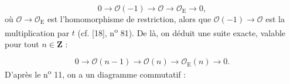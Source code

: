 \begin{equation*}
0 \rightarrow \mathcal{O}(-1) \rightarrow \mathcal{O} \rightarrow \mathcal{O}_{\mathrm{E}} \rightarrow 0,
\end{equation*}
où $\mathcal{O} \rightarrow \mathcal{O}_{\mathrm{E}}$ est l'homomorphisme de restriction, alors que $\mathcal{O}(-1) \rightarrow \mathcal{O}$ est la multiplication par $t$ (cf. [18], n\textsuperscript{o} 81). De là, on déduit une suite exacte, valable pour tout $n \in \mathbf{Z}$ :

\begin{equation*}
0 \rightarrow \mathcal{O}(n-1) \rightarrow \mathcal{O}(n) \rightarrow \mathcal{O}_{\mathrm{E}}(n) \rightarrow 0.
\end{equation*}
D'après le n\textsuperscript{o} 11, on a un diagramme commutatif :

